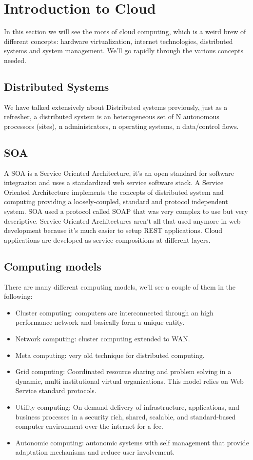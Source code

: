 \section{Introduction to Cloud}
In this section we will see the roots of cloud computing, which is a weird brew of different concepts: hardware virtualization, internet technologies, distributed systems and system management. \n
We'll go rapidly through the various concepts needed.
\subsection{Distributed Systems}
We have talked extensively about Distributed systems previously, just as a refresher, a distributed system is an heterogeneous set of N autonomous processors (sites), n administrators, n operating systems, n data/control flows.
\subsection{SOA}
A SOA is a Service Oriented Architecture, it's an open standard for software integrazion and uses a standardized web service software stack. \n
A Service Oriented Architecture implements the concepts of distributed system and computing providing a loosely-coupled, standard and protocol independent system. SOA used a protocol called SOAP that was very complex to use but very descriptive. Service Oriented Architectures aren't all that used anymore in web development because it's much easier to setup REST applications. \n
Cloud applications are developed as service compositions at different layers.
\subsection{Computing models}
There are many different computing models, we'll see a couple of them in the following:
\begin{itemize}
    \item Cluster computing: computers are interconnected through an high performance network and basically form a unique entity.
    \item Network computing: cluster computing extended to WAN.
    \item Meta computing: very old technique for distributed computing.
    \item Grid computing: Coordinated resource sharing and problem solving in a dynamic, multi institutional virtual organizations. \n
    This model relies on Web Service standard protocols.
    \item Utility computing: On demand delivery of infrastructure, applications, and business processes in a security rich, shared, scalable, and standard-based computer environment over the internet for a fee.
    \item Autonomic computing: autonomic systems with self management that provide adaptation mechanisms and reduce user involvement.
\end{itemize}
